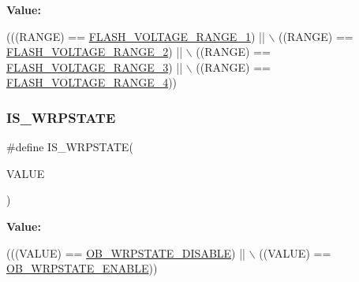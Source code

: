{\bfseries Value\+:}
\begin{DoxyCode}
(((RANGE) == \hyperlink{group___f_l_a_s_h_ex___voltage___range_ga5cadf49a63c968cde3b980e5139d398e}{FLASH\_VOLTAGE\_RANGE\_1}) || \(\backslash\)
                               ((RANGE) == \hyperlink{group___f_l_a_s_h_ex___voltage___range_gad047be2bc7aa9be946b5b0c6b3062ef3}{FLASH\_VOLTAGE\_RANGE\_2}) || \(\backslash\)
                               ((RANGE) == \hyperlink{group___f_l_a_s_h_ex___voltage___range_ga50950407a789684eec9216f49e0831a0}{FLASH\_VOLTAGE\_RANGE\_3}) || \(\backslash\)
                               ((RANGE) == \hyperlink{group___f_l_a_s_h_ex___voltage___range_gabf8037a482f18815c5a67f287223a658}{FLASH\_VOLTAGE\_RANGE\_4}))
\end{DoxyCode}
\mbox{\label{group___f_l_a_s_h_ex___i_s___f_l_a_s_h___definitions_ga8164622401a6cacf006679166de93c21}} 
\subsubsection{\texorpdfstring{I\+S\+\_\+\+W\+R\+P\+S\+T\+A\+TE}{IS\_WRPSTATE}}
{\footnotesize\ttfamily \#define I\+S\+\_\+\+W\+R\+P\+S\+T\+A\+TE(\begin{DoxyParamCaption}\item[{}]{V\+A\+L\+UE }\end{DoxyParamCaption})}

{\bfseries Value\+:}
\begin{DoxyCode}
(((VALUE) == \hyperlink{group___f_l_a_s_h_ex___w_r_p___state_gaa34eb6205fe554f65a311ee974d5a4ab}{OB\_WRPSTATE\_DISABLE}) || \(\backslash\)
                           ((VALUE) == \hyperlink{group___f_l_a_s_h_ex___w_r_p___state_ga9fc463145ab57616baa36d95523186a1}{OB\_WRPSTATE\_ENABLE}))
\end{DoxyCode}
